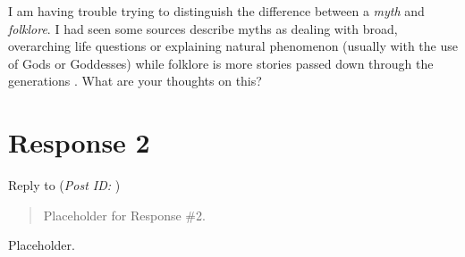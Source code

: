 \documentclass[12pt]{article}
\theoremstyle{definition}
\theoremstyle{plain}
\begin{document}
      I am having trouble trying to distinguish the difference between a
        \textit{myth} and \textit{folklore}. I had seen some sources
        describe myths as dealing with broad, overarching life questions
        or explaining natural phenomenon (usually with the use of Gods or
        Goddesses) while folklore is more stories passed down through the
        generations \autocite{lombardi_2020}. What are your thoughts on this?


    \section{Response 2}
      \begin{mdframed}
        Reply to \textbf{} (\textit{Post ID: }) 
      \end{mdframed}
      \begin{quote}
        Placeholder for Response \#2.
      \end{quote}
      Placeholder.

  \newpage
  \nocite{textbook}
  \printbibliography[
    heading=bibintoc,
    title={Works Cited}
  ]
\end{document}

